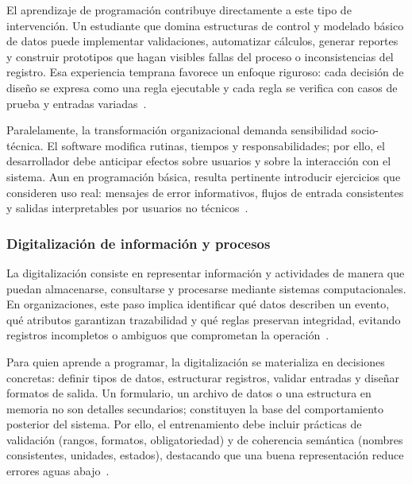 \documentclass[12pt,twoside]{book}
\begin{document}
					El aprendizaje de programación contribuye directamente a este tipo de intervención. Un estudiante que domina estructuras de control y modelado básico de datos puede implementar validaciones, automatizar cálculos, generar reportes y construir prototipos que hagan visibles fallas del proceso o inconsistencias del registro. Esa experiencia temprana favorece un enfoque riguroso: cada decisión de diseño se expresa como una regla ejecutable y cada regla se verifica con casos de prueba y entradas variadas~\cite{Hanly2015Problem,Gaddis2022Starting,ISO247722024Programming}.
					
					Paralelamente, la transformación organizacional demanda sensibilidad socio-técnica. El software modifica rutinas, tiempos y responsabilidades; por ello, el desarrollador debe anticipar efectos sobre usuarios y sobre la interacción con el sistema. Aun en programación básica, resulta pertinente introducir ejercicios que consideren uso real: mensajes de error informativos, flujos de entrada consistentes y salidas interpretables por usuarios no técnicos~\cite{Dix2004HCI,Kendall2014Systems,Laudon2020Management}.
					
					\subsubsection{Digitalización de información y procesos}
						\noindent
						La digitalización consiste en representar información y actividades de manera que puedan almacenarse, consultarse y procesarse mediante sistemas computacionales. En organizaciones, este paso implica identificar qué datos describen un evento, qué atributos garantizan trazabilidad y qué reglas preservan integridad, evitando registros incompletos o ambiguos que comprometan la operación~\cite{Laudon2020Management,Bernstein2009Data,Date2019Database}.
						
						Para quien aprende a programar, la digitalización se materializa en decisiones concretas: definir tipos de datos, estructurar registros, validar entradas y diseñar formatos de salida. Un formulario, un archivo de datos o una estructura en memoria no son detalles secundarios; constituyen la base del comportamiento posterior del sistema. Por ello, el entrenamiento debe incluir prácticas de validación (rangos, formatos, obligatoriedad) y de coherencia semántica (nombres consistentes, unidades, estados), destacando que una buena representación reduce errores aguas abajo~\cite{Gaddis2022Starting,Hanly2015Problem,ISO247722024Programming}.
						
\end{document}
